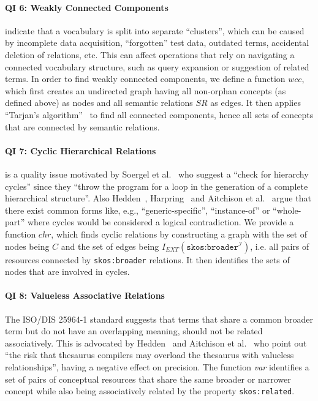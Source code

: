 \paragraph{QI 6: Weakly Connected Components}

indicate that a vocabulary is split into separate ``clusters'', which can be caused by incomplete data acquisition, ``forgotten'' test data, outdated terms, accidental deletion of relations, etc. This can affect operations that rely on navigating a connected vocabulary structure, such as query expansion or suggestion of related terms.
In order to find weakly connected components, we define a function $wcc$, which first creates an undirected graph having all non-orphan concepts (as defined above) as nodes and all semantic relations $SR$ as edges. It then applies ``Tarjan’s algorithm''~\cite{Hopcroft1973} to find all connected components, hence all sets of concepts that are connected by semantic relations.

\paragraph{QI 7: Cyclic Hierarchical Relations}

is a quality issue motivated by Soergel et al.~\cite{Soergel2002} who suggest a ``check for hierarchy cycles'' since they ``throw the program for a loop in the generation of a complete hierarchical structure''. Also Hedden~\cite{Hedden2010}, Harpring~\cite{Harpring2010} and Aitchison et al.~\cite{Aitchison2000} argue that there exist common forms like, e.g., ``generic-specific'', ``instance-of'' or ``whole-part'' where cycles would be considered a logical contradiction.
We provide a function $chr$, which finds cyclic relations by constructing a graph with the set of nodes being $C$ and the set of edges being $I_{EXT}(\texttt{skos:broader}^\mathcal{I})$, i.e. all pairs of resources connected by \texttt{skos:broader} relations. It then identifies the sets of nodes that are involved in cycles. 

\paragraph{QI 8: Valueless Associative Relations}

The ISO/DIS 25964-1 standard \cite{ISO25964-1:2011} suggests that terms that share a common broader term but do not have an overlapping meaning, should not be related associatively. This is advocated by Hedden~\cite{Hedden2010} and Aitchison et al.~\cite{Aitchison2000} who point out ``the risk that thesaurus compilers may overload the thesaurus with valueless relationships'', having a negative effect on precision.
The function \textit{var} identifies a set of pairs of conceptual resources that share the same broader or narrower concept while also being associatively related by the property \texttt{skos:related}.

